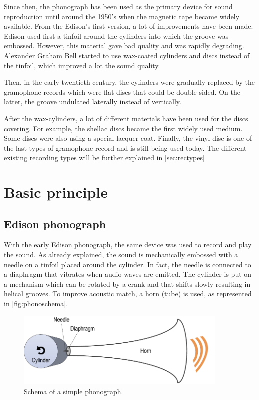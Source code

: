 Since then, the phonograph has been used as the primary device for sound reproduction until around the 1950's when the magnetic tape became widely available. From the Edison's first version, a lot of improvements have been made. Edison used first a tinfoil around the cylinders into which the groove was embossed. However, this material gave bad quality and was rapidly degrading. Alexander Graham Bell started to use wax-coated cylinders and discs instead of the tinfoil, which improved a lot the sound quality.

Then, in the early twentieth century, the cylinders were gradually replaced by the gramophone records which were flat discs that could be double-sided. On the latter, the groove undulated laterally instead of vertically.

After the wax-cylinders, a lot of different materials have been used for the discs covering. For example, the shellac discs became the first widely used medium. Some discs were also using a special lacquer coat. Finally, the vinyl disc is one of the last types of gramophone record and is still being used today. The different existing recording types will be further explained in \autoref{sec:rectypes}

\section{Basic principle}

\subsection{Edison phonograph}

With the early Edison phonograph, the same device was used to record and play the sound. As already explained, the sound is mechanically embossed with a needle on a tinfoil placed around the cylinder. In fact, the needle is connected to a diaphragm that vibrates when audio waves are emitted. The cylinder is put on a mechanism which can be rotated by a crank and that shifts slowly resulting in helical grooves. To improve acoustic match, a horn (tube) is used, as represented in \autoref{fig:phonoschema}.

\begin{figure}[!ht]
\centering
\includegraphics[width=0.9\textwidth]{images/phono-schema}
\caption{Schema of a simple phonograph.}
\label{fig:phonoschema}
\end{figure}

